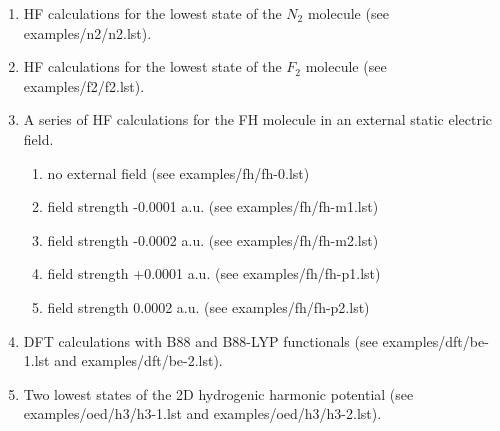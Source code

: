 \documentclass[12pt,a4paper]{article}
\begin{document}
\begin{enumerate}


\item HF calculations for the lowest state of the $N_2$ molecule (see
  examples/n2/n2.lst).




\newpage
\item HF calculations for the lowest state of the $F_2$ molecule (see
  examples/f2/f2.lst).



\newpage
\item A series of HF calculations for the FH molecule in an external
  static electric field.

\begin{enumerate}
\item no external field (see examples/fh/fh-0.lst)




\newpage

\item field strength -0.0001 a.u. (see examples/fh/fh-m1.lst)



\item field strength -0.0002 a.u. (see examples/fh/fh-m2.lst)



\newpage

\item field strength +0.0001 a.u. (see examples/fh/fh-p1.lst)



\item field strength 0.0002 a.u. (see examples/fh/fh-p2.lst)


\end{enumerate}

\newpage

\item DFT calculations with B88 and B88-LYP functionals (see
  examples/\-dft/\-be-1.\-lst and examples/\-dft/\-be-2.\-lst).






\newpage

\item Two lowest states of the 2D hydrogenic harmonic potential (see
  examples/\-oed/\-h3/\-h3-1.lst and examples/\-oed/\-h3/\-h3-2.lst).


\end{enumerate}
\end{document}
